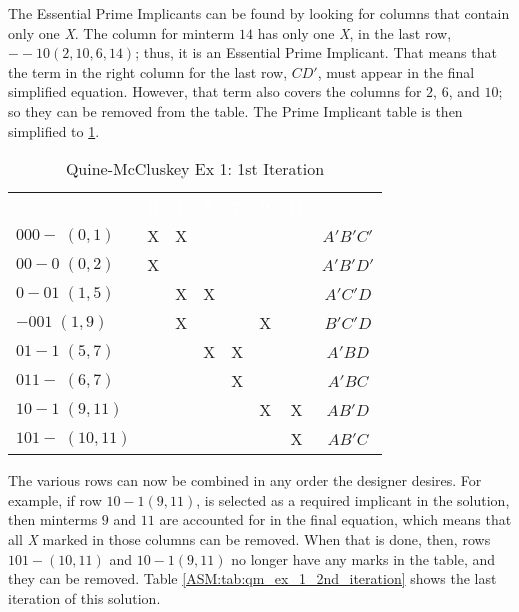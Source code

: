 The Essential Prime Implicants can be found by looking for columns that contain only one \emph{X}. The column for minterm $ 14 $ has only one \emph{X}, in the last row, $ --10 (2,10,6,14) $; thus, it is an Essential Prime Implicant. That means that the term in the right column for the last row, $ CD' $, must appear in the final simplified equation. However, that term also covers the columns for $ 2 $, $ 6 $, and $ 10 $; so they can be removed from the table. The Prime Implicant table is then simplified to \ref{ASM:tab:qm_ex_1_1st_iteration}.

\begin{table}[H]
	\sffamily
	\newcommand{\head}[1]{\textcolor{white}{\textbf{#1}}}		
	\begin{center}
		\begin{adjustbox}{max width=\textwidth}
			\begin{tabular}{lccccccc} 
				\rowcolor{black!75}
				& \head{0} & \head{1} & \head{5}
				& \head{7} & \head{9} & \head{11} & \\
				$ 000-\;(0,1) $       & X & X &   &   &   &   & $ A'B'C' $ \\
				$ 00-0\;(0,2) $       & X &   &   &   &   &   & $ A'B'D' $ \\
				$ 0-01\;(1,5) $       &   & X & X &   &   &   & $ A'C'D $ \\
				$ -001\;(1,9) $       &   & X &   &   & X &   & $ B'C'D $ \\
				$ 01-1\;(5,7) $       &   &   & X & X &   &   & $ A'BD $ \\
				$ 011-\;(6,7) $       &   &   &   & X &   &   & $ A'BC $ \\
				$ 10-1\;(9,11) $      &   &   &   &   & X & X & $ AB'D $ \\
				$ 101-\;(10,11) $     &   &   &   &   &   & X & $ AB'C $ \\
				\hline
			\end{tabular}
		\end{adjustbox}
	\end{center}
	\caption{Quine-McCluskey Ex 1: 1st Iteration}
  \label{ASM:tab:qm_ex_1_1st_iteration}
\end{table}

The various rows can now be combined in any order the designer desires. For example, if row $ 10-1 (9,11) $, is selected as a required implicant in the solution, then minterms $ 9 $ and $ 11 $ are accounted for in the final equation, which means that all \emph{X} marked in those columns can be removed. When that is done, then, rows $ 101- (10,11) $ and $ 10-1 (9,11) $ no longer have any marks in the table, and they can be removed. Table \ref{ASM:tab:qm_ex_1_2nd_iteration} shows the last iteration of this solution. 

